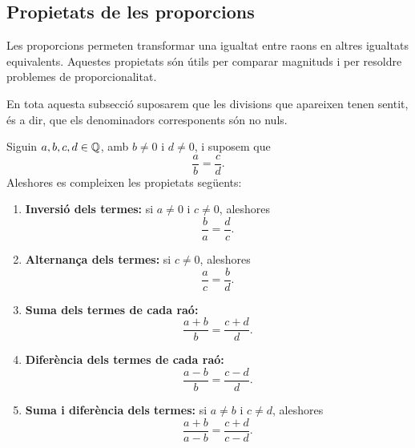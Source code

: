 \subsection{Propietats de les proporcions}

Les proporcions permeten transformar una igualtat entre raons en altres igualtats equivalents. Aquestes propietats són útils per comparar magnituds i per resoldre problemes de proporcionalitat.

En tota aquesta subsecció suposarem que les divisions que apareixen tenen sentit, és a dir, que els denominadors corresponents són no nuls.

\begin{proposicio}
Siguin \(a,b,c,d\in\mathbb{Q}\), amb \(b\neq0\) i \(d\neq0\), i suposem que
\[
	\frac{a}{b}=\frac{c}{d}.
\]
Aleshores es compleixen les propietats següents:

\begin{enumerate}
	\item \textbf{Inversió dels termes:} si \(a\neq0\) i \(c\neq0\), aleshores
	\[
		\frac{b}{a}=\frac{d}{c}.
	\]

	\item \textbf{Alternança dels termes:} si \(c\neq0\), aleshores
	\[
		\frac{a}{c}=\frac{b}{d}.
	\]

	\item \textbf{Suma dels termes de cada raó:}
	\[
		\frac{a+b}{b}=\frac{c+d}{d}.
	\]

	\item \textbf{Diferència dels termes de cada raó:}
	\[
		\frac{a-b}{b}=\frac{c-d}{d}.
	\]

	\item \textbf{Suma i diferència dels termes:} si \(a\neq b\) i \(c\neq d\), aleshores
	\[
		\frac{a+b}{a-b}=\frac{c+d}{c-d}.
	\]
\end{enumerate}
\end{proposicio}

